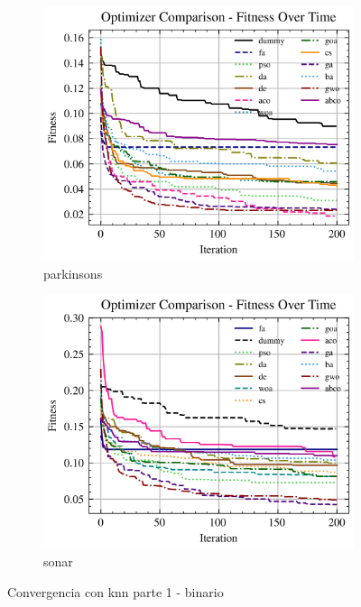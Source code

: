 \begin{figure}[htp]
    \begin{subfigure}[htp]{0.45\textwidth}
        \includegraphics[width=\textwidth]{imagenes/fitness_charts/img/binary/parkinsons/optimizers_fitness_knn.png}
        \caption{parkinsons}
        \label{fig:convergencia_parkinsons_knn}
    \end{subfigure}
    \begin{subfigure}[htp]{0.45\textwidth}
        \includegraphics[width=\textwidth]{imagenes/fitness_charts/img/binary/sonar/optimizers_fitness_knn.png}
        \caption{sonar}
        \label{fig:convergencia_sonar_knn}
    \end{subfigure}
    \caption{Convergencia con knn parte 1 - binario}
    \label{fig:convergencia_knn_1}
\end{figure}

